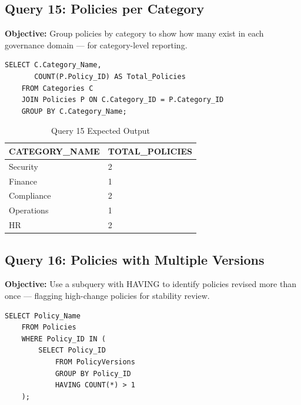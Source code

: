 \documentclass[conference]{IEEEtran}
\begin{document}
\subsection{Query 15: Policies per Category}

\textbf{Objective:} Group policies by category to show how many exist in each governance domain — for category-level reporting.

\begin{lstlisting}[style=sqlstyle, caption={Query 15: Policies per Category (JOIN + GROUP BY)}]
SELECT C.Category_Name,
       COUNT(P.Policy_ID) AS Total_Policies
    FROM Categories C
    JOIN Policies P ON C.Category_ID = P.Category_ID
    GROUP BY C.Category_Name;
\end{lstlisting}

\begin{table}[H]
\centering
\caption{Query 15 Expected Output}
\begin{tabular}{|l|l|}
\hline
\textbf{CATEGORY\_NAME} & \textbf{TOTAL\_POLICIES} \\
\hline
Security    & 2 \\
Finance     & 1 \\
Compliance  & 2 \\
Operations  & 1 \\
HR          & 2 \\
\hline
\end{tabular}
\end{table}

\subsection{Query 16: Policies with Multiple Versions}

\textbf{Objective:} Use a subquery with HAVING to identify policies revised more than once — flagging high-change policies for stability review.

\begin{lstlisting}[style=sqlstyle, caption={Query 16: Multi-Version Policies (Subquery + HAVING)}]
SELECT Policy_Name
    FROM Policies
    WHERE Policy_ID IN (
        SELECT Policy_ID
            FROM PolicyVersions
            GROUP BY Policy_ID
            HAVING COUNT(*) > 1
    );
\end{lstlisting}
\end{document}
